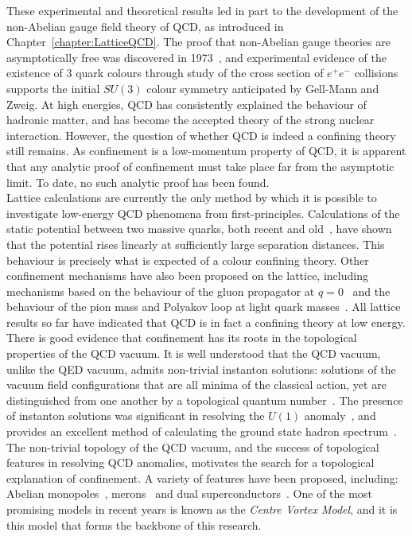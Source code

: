 These experimental and theoretical results led in part to the development of the non-Abelian gauge field theory of QCD, as introduced in Chapter~\ref{chapter:LatticeQCD}. The proof that non-Abelian gauge theories are asymptotically free was discovered in 1973~\cite{Gross:1973id}, and experimental evidence of the existence of 3 quark colours through study of the cross section of $e^+ e^-$ collisions supports the initial $SU(3)$ colour symmetry anticipated by Gell-Mann and Zweig. At high energies, QCD has consistently explained the behaviour of hadronic matter, and has become the accepted theory of the strong nuclear interaction. However, the question of whether QCD is indeed a confining theory still remains. As confinement is a low-momentum property of QCD, it is apparent that any analytic proof of confinement must take place far from the asymptotic limit. To date, no such analytic proof has been found.\\

Lattice calculations are currently the only method by which it is possible to investigate low-energy QCD phenomena from first-principles. Calculations of the static potential between two massive quarks, both recent and old~\cite{Born:1993cq, Bonnet:1999gt, Creutz:1980hb, DiGiacomo:1990hc}, have shown that the potential rises linearly at sufficiently large separation distances. This behaviour is precisely what is expected of a colour confining theory. Other confinement mechanisms have also been proposed on the lattice, including mechanisms based on the behaviour of the gluon propagator at $q=0$~\cite{Zwanziger:1991gz} and the behaviour of the pion mass and Polyakov loop at light quark masses~\cite{Iwasaki:1991mr}. All lattice results so far have indicated that QCD is in fact a confining theory at low energy.\\

There is good evidence that confinement has its roots in the topological properties of the QCD vacuum. It is well understood that the QCD vacuum, unlike the QED vacuum, admits non-trivial instanton solutions: solutions of the vacuum field configurations that are all minima of the classical action, yet are distinguished from one another by a topological quantum number~\cite{Belavin:1975fg}. The presence of instanton solutions was significant in resolving the $U(1)$ anomaly~\cite{tHooft:1986ooh}, and provides an excellent method of calculating the ground state hadron spectrum~\cite{Schafer:1996wv}. The non-trivial topology of the QCD vacuum, and the success of topological features in resolving QCD anomalies, motivates the search for a topological explanation of confinement. A variety of features have been proposed, including: Abelian monopoles~\cite{Ivanenko:1990xu, Chernodub:1995tt}, merons~\cite{Callan:1977qs} and dual superconductors~\cite{Mandelstam:1974pi,tHooft:1982ylj}. One of the most promising models in recent years is known as the \textit{Centre Vortex Model}, and it is this model that forms the backbone of this research.

